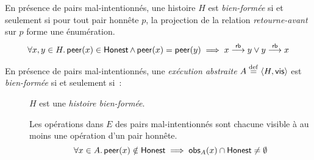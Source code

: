 \begin{definition}\label{def:wf-history-malicious}
En présence de pairs mal-intentionnés, une histoire $H$ est \emph{bien-formée} si et seulement si pour tout pair honnête $p$, la projection de la relation \emph{retourne-avant} sur $p$ forme une énumération.
\begin{equation*}
\forall x, y \in H \qsep \trm{peer}(x) \in \trm{Honest} \land \trm{peer}(x) = \trm{peer}(y) \implies x \rb y \lor y \rb x
\end{equation*}
\end{definition}

\begin{definition}\label{def:wf-abstract-exec-malicious}
En présence de pairs mal-intentionnés, une \emph{exécution abstraite} $A \defeq \tuple*{H, \trm{vis}}$ est \emph{bien-formée} si et seulement si~:
\begin{description}
  \item[] $H$ est une \emph{histoire bien-formée}.

  \item[] Les opérations dans $E$ des pairs mal-intentionnés sont chacune visible à au moins une opération d'un pair honnête.
  \begin{equation*}
    \forall x \in A \qsep \trm{peer}(x) \notin \trm{Honest} \implies \trm{obs}_A(x) \cap \trm{Honest} \neq \emptyset
  \end{equation*}
\end{description}
\end{definition}

